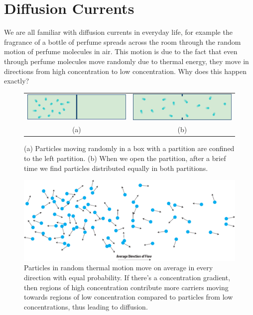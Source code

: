 \section{Diffusion Currents}
We are all familiar with diffusion currents in everyday life, for example the fragrance of a bottle of perfume spreads across the room through the random motion of perfume molecules in air.  This motion is due to the fact that even through perfume molecules move randomly due to thermal energy, they move in directions from high concentration to low concentration.  Why does this happen exactly?
\begin{figure}[H]
\centering
\begin{tabular}{cc}
\includegraphics[width=.45\columnwidth]{partition_closed} &
\includegraphics[width=.45\columnwidth]{partition_open}\\ 
 (a) & (b)\\
\end{tabular}
\caption{(a)  Particles moving randomly in a box with a partition are confined to the left partition.  (b)  When we open the partition, after a brief time we find particles distributed equally in both partitions.}
\label{fig:slide46}
\end{figure}
\begin{figure}[H]
\centering
\includegraphics[width=.95\columnwidth]{random_flow}
\caption{Particles in random thermal motion move on average in every direction with equal probability.  If there's a concentration gradient, then regions of high concentration contribute more carriers moving towards regions of low concentration compared to particles from low concentrations, thus leading to diffusion.}
\label{fig:random_flow}
\end{figure}
